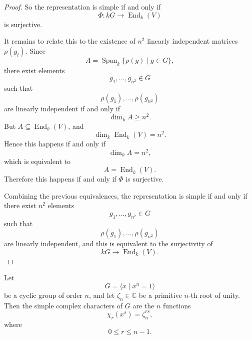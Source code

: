 \begin{proof}
        So the representation is simple if and only if
        \[
            \Phi:kG\longrightarrow \operatorname{End}_k(V)
        \]
        is surjective.
        
        It remains to relate this to the existence of \(n^2\) linearly independent matrices
        \(\rho(g_i)\). Since
        \[
            A=\operatorname{Span}_k\{\rho(g)\mid g\in G\},
        \]
        there exist elements
        \[
            g_1,\ldots,g_{n^2}\in G
        \]
        such that
        \[
            \rho(g_1),\ldots,\rho(g_{n^2})
        \]
        are linearly independent if and only if
        \[
            \dim_k A \geq n^2.
        \]
        But \(A\subseteq \operatorname{End}_k(V)\), and
        \[
            \dim_k \operatorname{End}_k(V)=n^2.
        \]
        Hence this happens if and only if
        \[
            \dim_k A=n^2,
        \]
        which is equivalent to
        \[
            A=\operatorname{End}_k(V).
        \]
        Therefore this happens if and only if \(\Phi\) is surjective.
        
        Combining the previous equivalences, the representation is simple if and only if there
        exist \(n^2\) elements
        \[
            g_1,\ldots,g_{n^2}\in G
        \]
        such that
        \[
            \rho(g_1),\ldots,\rho(g_{n^2})
        \]
        are linearly independent, and this is equivalent to the surjectivity of
        \[
            kG\longrightarrow \operatorname{End}_k(V).
        \]
        \end{proof}
    
    \begin{exercise}
    Let
    \[
        G = \langle x \mid x^n = 1 \rangle
    \]
    be a cyclic group of order \(n\), and let \(\zeta_n\in\mathbb{C}\) be a primitive
    \(n\)-th root of unity. Then the simple complex characters of \(G\) are the
    \(n\) functions
    \[
        \chi_r(x^s) = \zeta_n^{rs},
    \]
    where
    \[
        0 \leq r \leq n-1.
    \]
    \end{exercise}

